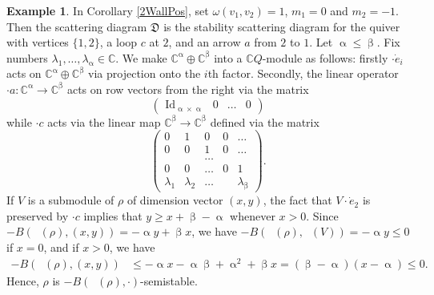 \documentclass{amsart}
\newcommand{\lp}[1]{\dot{e}_{#1}}
\DeclareMathOperator{\Id}{Id}
\DeclareMathOperator{\udim}{\underline{\dim}}
\let\bb=\mathbb
\let\f=\mathfrak
\renewcommand{\alpha}{\upalpha}
\renewcommand{\beta}{\upbeta}
\theoremstyle{plain}%
\theoremstyle{definition}
\newtheorem{eg}[thm]{Example}
\theoremstyle{remark}
\begin{document}
\begin{eg}\label{dense_example}
In Corollary \ref{2WallPos}, set $\omega(v_1,v_2)=1$, $m_1=0$ and $m_2=-1$.  Then the scattering diagram $\f{D}$ is the stability scattering diagram for the quiver with vertices $\{1,2\}$, a loop $c$  at $2$, and an arrow $a$ from $2$ to $1$.  Let $\alpha\leq\beta$.  Fix numbers $\lambda_1,\ldots,\lambda_{\alpha}\in\bb{C}$.  We make $\bb{C}^{\alpha}\oplus\bb{C}^{\beta}$ into a $\bb{C}Q$-module as follows: firstly $\cdot \lp{i}$ acts on $\bb{C}^{\alpha}\oplus\bb{C}^{\beta}$ via projection onto the $i$th factor.  Secondly, the linear operator $\cdot a\colon \bb{C}^{\alpha}\rightarrow\bb{C}^{\beta}$ acts on row vectors from the right via the matrix 
\[
\left(\begin{array}{cccc} \Id_{\alpha\times\alpha} & 0& \ldots & 0\end{array}\right)
\]
while $\cdot c$ acts  via the linear map $\bb{C}^{\beta}\rightarrow \bb{C}^{\beta}$ defined via the matrix 
\[
\left(\begin{array}{ccccc}  0&1&0&0&\ldots\\
 0& 0& 1 &0&\ldots\\
 &&\ldots&&\\
0&0&\ldots&0&1\\
\lambda_1&\lambda_2&\ldots&&\lambda_{\beta}
\end{array}\right).
\]
If $V$ is a submodule of $\rho$ of dimension vector $(x,y)$, the fact that $V\cdot \lp{2}$ is preserved by $\cdot c$ implies that $y\geq x+\beta-\alpha$ whenever $x>0$.  Since $-B(\udim(\rho),(x,y))=-\alpha y +\beta x$, we have $-B(\udim(\rho),\udim(V))=-\alpha y\leq 0$ if $x=0$, and if $x> 0$, we have \begin{align*}
    -B(\udim(\rho),(x,y))  & \leq -\alpha x -\alpha\beta+\alpha^2+\beta x=(\beta-\alpha)(x-\alpha)\leq 0.
\end{align*} 
Hence, $\rho$ is $-B(\udim(\rho),\cdot)$-semistable.


\end{eg}
\end{document}
